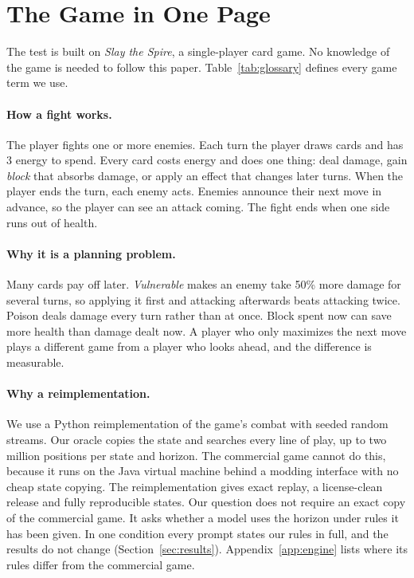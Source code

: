 \section{The Game in One Page}
\label{sec:game}

The test is built on \emph{Slay the Spire}, a single-player card game. No knowledge of the game is needed to follow this paper. Table~\ref{tab:glossary} defines every game term we use.

\paragraph{How a fight works.} The player fights one or more enemies. Each turn the player draws cards and has 3 energy to spend. Every card costs energy and does one thing: deal damage, gain \emph{block} that absorbs damage, or apply an effect that changes later turns. When the player ends the turn, each enemy acts. Enemies announce their next move in advance, so the player can see an attack coming. The fight ends when one side runs out of health.

\paragraph{Why it is a planning problem.} Many cards pay off later. \emph{Vulnerable} makes an enemy take 50\% more damage for several turns, so applying it first and attacking afterwards beats attacking twice. Poison deals damage every turn rather than at once. Block spent now can save more health than damage dealt now. A player who only maximizes the next move plays a different game from a player who looks ahead, and the difference is measurable.

\paragraph{Why a reimplementation.} We use a Python reimplementation of the game's combat with seeded random streams. Our oracle copies the state and searches every line of play, up to two million positions per state and horizon. The commercial game cannot do this, because it runs on the Java virtual machine behind a modding interface with no cheap state copying. The reimplementation gives exact replay, a license-clean release and fully reproducible states. Our question does not require an exact copy of the commercial game. It asks whether a model uses the horizon under rules it has been given. In one condition every prompt states our rules in full, and the results do not change (Section~\ref{sec:results}). Appendix~\ref{app:engine} lists where its rules differ from the commercial game.

